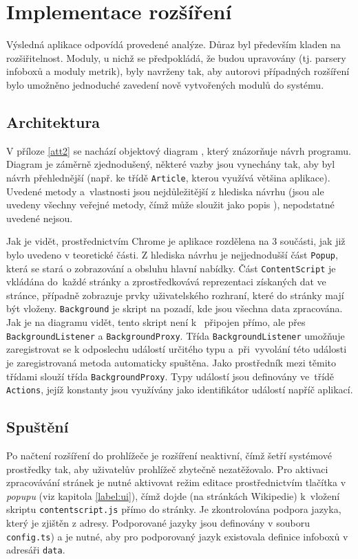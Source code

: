  
 
\chapter{Implementace rozšíření}
Výsledná aplikace odpovídá provedené analýze. Důraz byl především kladen na rozšiřitelnost. Moduly, u nichž se předpokládá, že budou upravovány (tj. parsery infoboxů a moduly metrik), byly navrženy tak, aby autorovi případných rozšíření bylo umožněno jednoduché zavedení nově vytvořených modulů do systému.

\section{Architektura}
V příloze \ref{att2} se nachází objektový diagram , který znázorňuje návrh programu. Diagram je záměrně zjednodušený, některé vazby jsou vynechány tak, aby byl návrh přehlednější (např. ke třídě \texttt{Article}, kterou využívá většina aplikace). Uvedené metody a~vlastnosti jsou nejdůležitější z hlediska návrhu (jsou ale uvedeny všechny veřejné metody, čímž může  sloužit jako popis ), nepodstatné uvedené nejsou.

Jak je vidět, prostřednictvím Chrome  je aplikace rozdělena na 3 součásti, jak již bylo uvedeno v teoretické části. Z hlediska návrhu je nejjednodušší část \texttt{Popup}, která se stará o zobrazování a obsluhu hlavní nabídky. Část \texttt{ContentScript} je vkládána do~každé stránky a zprostředkovává reprezentaci získaných dat ve stránce, případně zobrazuje prvky uživatelského rozhraní, které do stránky mají být vloženy. \texttt{Background} je skript na pozadí, kde jsou všechna data zpracována. Jak je na  diagramu vidět, tento skript není k~ připojen přímo, ale přes \texttt{BackgroundListener} a \texttt{BackgroundProxy}. Třída \texttt{Back\-ground\-Listener} umožňuje zaregistrovat se k odposlechu událostí určitého typu a~při~vyvolání této události je zaregistrovaná metoda automaticky spuštěna. Jako prostředník mezi těmito třídami slouží třída \texttt{BackgroundProxy}. Typy událostí jsou definovány ve~třídě \texttt{Actions}, jejíž konstanty jsou využívány jako identifikátor událostí napříč aplikací.

\section{Spuštění}
Po načtení rozšíření do prohlížeče je rozšíření neaktivní, čímž šetří systémové prostředky tak, aby uživatelův prohlížeč zbytečně nezatěžovalo. Pro aktivaci zpracovávání stránek je nutné aktivovat režim editace prostřednictvím tlačítka v \textit{popupu} (viz kapitola \ref{label:ui}), čímž dojde (na stránkách Wikipedie) k~vložení skriptu \texttt{contentscript.js} přímo do stránky. Je zkontrolována podpora jazyka, který je zjištěn z adresy. Podporované jazyky jsou definovány v souboru \texttt{config.ts}) a je nutné, aby pro podporovaný jazyk existovala definice infoboxů v adresáři \texttt{data}.

